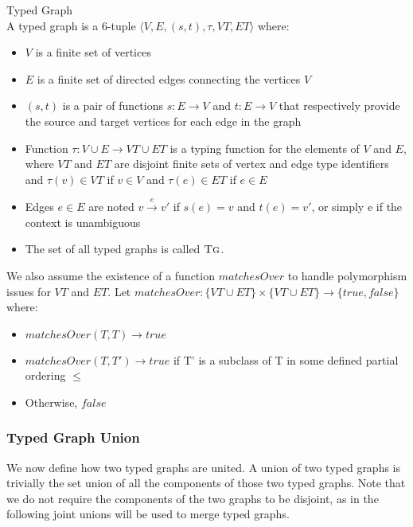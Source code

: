 \begin{definition}{Typed Graph\\}
\label{def:typed_graph}
A typed graph is a 6-tuple $\langle V,E,(s,t),\tau, VT, ET\rangle$ where:
\begin{itemize}
\item $V$ is a finite set of vertices
\item $E$ is a finite set of directed edges connecting the vertices $V$
\item $(s,t)$ is a pair of functions $s: E\rightarrow V$ and $t: E\rightarrow V$ that respectively provide the source and target vertices for each edge in the graph
\item Function $\tau:V\cup E\rightarrow VT \cup ET$ is a typing function for the elements of $V$ and $E$, where $VT$ and $ET$ are disjoint finite sets of vertex and edge type identifiers and $\tau(v)\in VT$ if $v\in V$ and $\tau(e)\in ET$ if $e\in E$
\item Edges $e\in E$ are noted $v\xrightarrow{e} v'$ if $s(e)=v$ and $t(e)=v'$, or simply e if the context is unambiguous
\item The set of all typed graphs is called $\textsc{Tg}$. 
\end{itemize}
\end{definition}

We also assume the existence of a function $\mathit{matchesOver}$ to handle polymorphism issues for $VT$ and $ET$. Let $\mathit{matchesOver}: \{VT \cup ET\} \times \{VT \cup ET\} \rightarrow \{\mathit{true}, \mathit{false}\}$ where:
\begin{itemize}
\item $\mathit{matchesOver}(T, T) \rightarrow \mathit{true}$
\item $\mathit{matchesOver}(T, T') \rightarrow \mathit{true}$ if T' is a subclass of T in some defined partial ordering $\leq$
\item Otherwise, $\mathit{false}$
\end{itemize}


\subsubsection*{Typed Graph Union}
We now define how two typed graphs are united. A union of two typed graphs is trivially the set union of all the components of those two typed graphs. Note that we do not require the components of the two graphs to be disjoint, as in the following joint unions will be used to merge typed graphs.

